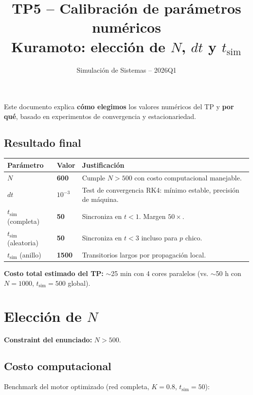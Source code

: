 \documentclass[11pt,a4paper]{article}
\title{\vspace{-1cm}\textbf{TP5 -- Calibración de parámetros numéricos}\\[2pt]\large Kuramoto: elección de $N$, $dt$ y $t_{\text{sim}}$}
\author{Simulación de Sistemas -- 2026Q1}
\date{}
\begin{document}
\maketitle
\vspace{-0.8cm}

Este documento explica \textbf{cómo elegimos} los valores numéricos del TP y \textbf{por qué}, basado en experimentos de convergencia y estacionariedad.

\subsection*{Resultado final}

\begin{center}
\renewcommand{\arraystretch}{1.25}
\begin{tabular}{@{}l l p{8.8cm}@{}}
\toprule
\textbf{Parámetro} & \textbf{Valor} & \textbf{Justificación} \\
\midrule
$N$ & \textbf{600} & Cumple $N>500$ con costo computacional manejable. \\
$dt$ & \textbf{$10^{-3}$} & Test de convergencia RK4: mínimo estable, precisión de máquina. \\
$t_{\text{sim}}$ (completa)  & \textbf{50}   & Sincroniza en $t<1$. Margen $50\times$. \\
$t_{\text{sim}}$ (aleatoria) & \textbf{50}   & Sincroniza en $t<3$ incluso para $p$ chico. \\
$t_{\text{sim}}$ (anillo)    & \textbf{1500} & Transitorios largos por propagación local. \\
\bottomrule
\end{tabular}
\end{center}

\textbf{Costo total estimado del TP:} $\sim$25 min con 4 cores paralelos (vs. $\sim$50 h con $N=1000$, $t_{\text{sim}}=500$ global).

\section{Elección de $N$}

\textbf{Constraint del enunciado:} $N > 500$.

\subsection*{Costo computacional}

Benchmark del motor optimizado (red completa, $K=0.8$, $t_{\text{sim}}=50$):
\end{document}

